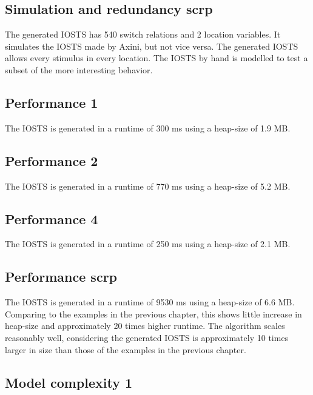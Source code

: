 \subsection{Simulation and redundancy scrp}
The generated IOSTS has 540 switch relations and 2 location variables. It simulates the IOSTS made by Axini, but not vice versa. The generated IOSTS allows every stimulus in every location. The IOSTS by hand is modelled to test a subset of the more interesting behavior.

\subsection{Performance 1}
The IOSTS is generated in a runtime of 300 ms using a heap-size of 1.9 MB.

\subsection{Performance 2}
The IOSTS is generated in a runtime of 770 ms using a heap-size of 5.2 MB.

\subsection{Performance 4}
The IOSTS is generated in a runtime of 250 ms using a heap-size of 2.1 MB.

\subsection{Performance scrp}
The IOSTS is generated in a runtime of 9530 ms using a heap-size of 6.6 MB. Comparing to the examples in the previous chapter, this shows little increase in heap-size and approximately 20 times higher runtime. The algorithm scales reasonably well, considering the generated IOSTS is approximately 10 times larger in size than those of the examples in the previous chapter. 

\subsection{Model complexity 1}
\begin{comment}
start:
13 distinct operands
1 distinct operator
33 operands
3 operators

move:
2 new distinct operands
5 new distinct operators
27 operands
6 operators

nextTurn:
0 new distinct operands
1 new distinct operator
13 operands
5 operators

throws:
3 new distinct operands
2 new distinct operators
30 operands
10 operators

$n_1 = 9, n_2 = 18, N_1 = 24, N_2 = 103$ 
 Volume is 127*4.75 = 603.25

IOSTS:
22 distinct operands
5 distinct operators
62 operands
25 operators

$n_1 = 5, n_2 = 22, N_1 = 25, N_2 = 62$
 Volume is 87*4.75 = 413.25
\end{comment}

